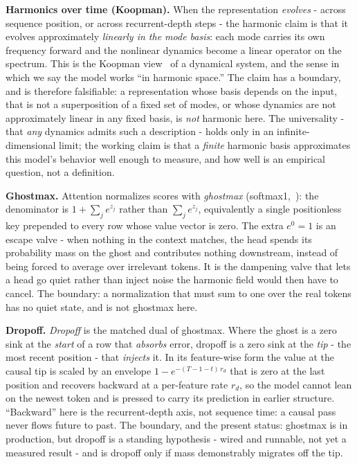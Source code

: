 \textbf{Harmonics over time (Koopman).} When the representation \textit{evolves} - across sequence position, or across recurrent-depth steps - the harmonic claim is that it evolves approximately \textit{linearly in the mode basis}: each mode carries its own frequency forward and the nonlinear dynamics become a linear operator on the spectrum. This is the Koopman view~\cite{koopman1931} of a dynamical system, and the sense in which we say the model works ``in harmonic space.'' The claim has a boundary, and is therefore falsifiable: a representation whose basis depends on the input, that is not a superposition of a fixed set of modes, or whose dynamics are not approximately linear in any fixed basis, is \textit{not} harmonic here. The universality - that \textit{any} dynamics admits such a description - holds only in an infinite-dimensional limit; the working claim is that a \textit{finite} harmonic basis approximates this model's behavior well enough to measure, and how well is an empirical question, not a definition.

\textbf{Ghostmax.} Attention normalizes scores with \textit{ghostmax} (softmax1,~\cite{miller2023}): the denominator is $1 + \sum_j e^{z_j}$ rather than $\sum_j e^{z_j}$, equivalently a single positionless key prepended to every row whose value vector is zero. The extra $e^{0}=1$ is an escape valve - when nothing in the context matches, the head spends its probability mass on the ghost and contributes nothing downstream, instead of being forced to average over irrelevant tokens. It is the dampening valve that lets a head go quiet rather than inject noise the harmonic field would then have to cancel. The boundary: a normalization that must sum to one over the real tokens has no quiet state, and is not ghostmax here.

\textbf{Dropoff.} \textit{Dropoff} is the matched dual of ghostmax. Where the ghost is a zero sink at the \textit{start} of a row that \textit{absorbs} error, dropoff is a zero sink at the \textit{tip} - the most recent position - that \textit{injects} it. In its feature-wise form the value at the causal tip is scaled by an envelope $1 - e^{-(T-1-t)\,r_d}$ that is zero at the last position and recovers backward at a per-feature rate $r_d$, so the model cannot lean on the newest token and is pressed to carry its prediction in earlier structure. ``Backward'' here is the recurrent-depth axis, not sequence time: a causal pass never flows future to past. The boundary, and the present status: ghostmax is in production, but dropoff is a standing hypothesis - wired and runnable, not yet a measured result - and is dropoff only if mass demonstrably migrates off the tip.

